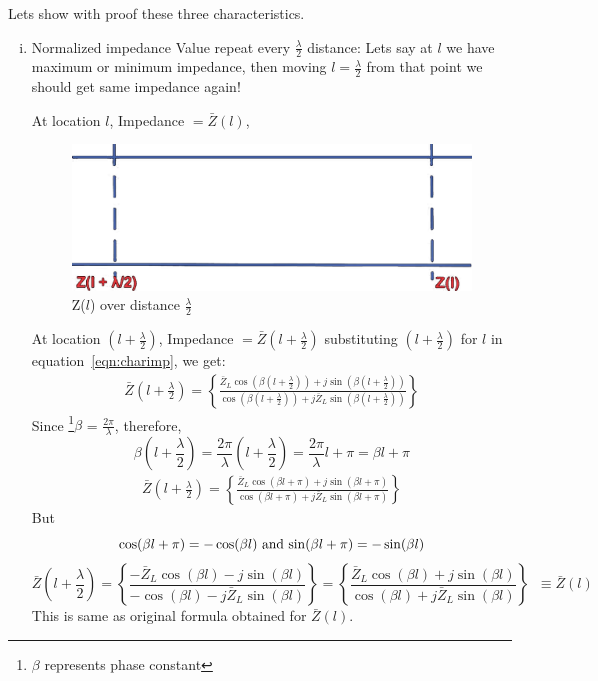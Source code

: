 Lets show with proof these three characteristics.
\begin{enumerate}[(i)]
\item Normalized impedance Value repeat every $\frac{\lambda}{2}$ distance: Lets say at $l$ we have maximum or minimum impedance, then moving $l=\frac{\lambda}{2}$ from that point we should get same impedance again!

At location $l$, Impedance $= \bar{Z}(l)$,
\begin{figure}[h]
\centering
\includegraphics[width=0.8\linewidth]{./graphics/6}
\caption{Z($l$) over distance $\frac{\lambda}{2}$}
\label{fig:astyuif}
\end{figure}

At location ${\left(l+\frac{\lambda}{2}\right)}$, Impedance $= \bar{Z}\left(l+\frac{\lambda}{2}\right)$ substituting ${\left(l+\frac{\lambda}{2}\right)}$ for $l$ in equation~\ref{eqn:charimp}, we get: 
\begin{align*}
\bar{Z}\left(l+\frac{\lambda}{2}\right) = \left\lbrace \frac{\bar{Z}_L \cos(\beta \left(l+\frac{\lambda}{2}\right)) + j\sin(\beta \left(l+\frac{\lambda}{2}\right))}{\cos(\beta \left(l+\frac{\lambda}{2}\right)) + j\bar{Z}_L \sin(\beta \left(l+\frac{\lambda}{2}\right))}\right\rbrace 
\end{align*}
Since \footnote{$\beta$ represents phase constant}$\beta$ = $ \frac{2\pi}{\lambda}$, therefore,
\begin{dmath*}
\beta\left(l+\frac{\lambda}{2}\right)=\frac{2\pi}{\lambda}\left(l+\frac{\lambda}{2}\right)=\frac{2\pi}{\lambda}l+\pi=\beta l+\pi
\end{dmath*}
\begin{align*}
\bar{Z}\left(l+\frac{\lambda}{2}\right) = \left\lbrace \frac{\bar{Z}_L\cos(\beta l+\pi) + j\sin(\beta l+\pi)}{\cos(\beta l+\pi) + j\bar{Z}_L\sin(\beta l+\pi)}\right\rbrace 
\end{align*}
But 
\[
\cos(\beta l+\pi)=-\cos(\beta l)$ and $\sin(\beta l+\pi)=-\sin(\beta l)
\] 
\begin{dmath*}
\bar{Z}\left(l+\frac{\lambda}{2}\right)=\left\lbrace \frac{-\bar{Z}_L \cos(\beta l) - j\sin(\beta l)}{-\cos(\beta l) - j\bar{Z}_L \sin(\beta l)}\right\rbrace = \left\lbrace \frac{\bar{Z}_L \cos(\beta l) + j\sin(\beta l)}{\cos(\beta l) + j\bar{Z}_L \sin(\beta l)}\right\rbrace\;\;\equiv \bar{Z}(l)
\end{dmath*} 
This is same as original formula obtained for $\bar{Z}(l)$.


\end{enumerate}
